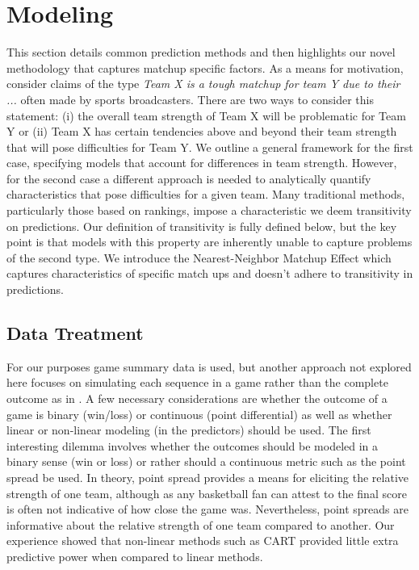 \section{Modeling}
This section details common prediction methods and then highlights our novel methodology that captures matchup specific factors.  As a means for motivation, consider claims of the type \emph{Team X is a tough matchup for team Y due to their ...} often made by sports broadcasters.  There are two ways to consider this statement: (i) the overall team strength of Team X will be problematic for Team Y or (ii) Team X has certain tendencies above and beyond their team strength that will pose difficulties for Team Y.  We outline a general framework for the first case, specifying models that account for differences in team strength.  However, for the second case a different approach is needed to analytically quantify characteristics that pose difficulties for a given team.  Many traditional methods, particularly those based on rankings, impose a characteristic we deem transitivity on predictions.  Our definition of transitivity is fully defined below, but the key point is that models with this property are inherently unable to capture problems of the second type.  We introduce the Nearest-Neighbor Matchup Effect which captures characteristics of specific match ups and doesn't adhere to transitivity in predictions.  

\subsection{Data Treatment}
For our purposes game summary data is used, but another approach not explored here focuses on simulating each sequence in a game rather than the complete outcome as in \cite{vstrumbelj2012}.  A few necessary considerations are whether the outcome of a game is binary (win/loss) or continuous (point differential) as well as whether linear or non-linear modeling (in the predictors) should be used.  The first interesting dilemma involves whether the outcomes should be modeled in a binary sense (win or loss) or rather should a continuous metric such as the point spread be used.  In theory, point spread provides a means for eliciting the relative strength of one team, although as any basketball fan can attest to the final score is often not indicative of how close the game was.  Nevertheless, point spreads are informative about the relative strength of one team compared to another.  Our experience showed that non-linear methods such as CART provided little extra predictive power when compared to linear methods.  

